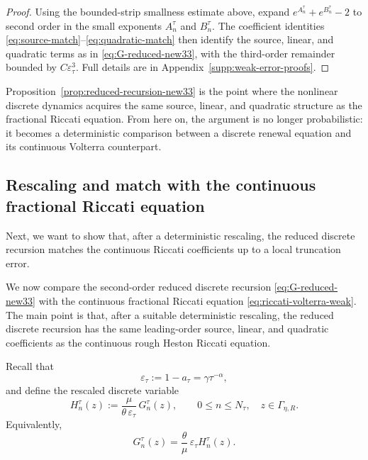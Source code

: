 \documentclass[letterpaper]{article}
\numberwithin{equation}{section}
\theoremstyle{definition}
\theoremstyle{remark}
\begin{document}
\begin{proof}
{Using the bounded-strip smallness estimate above, expand $e^{A_n^\tau}+e^{B_n^\tau}-2$ to second order in the small exponents $A_n^\tau$ and $B_n^\tau$. The coefficient identities \eqref{eq:source-match}--\eqref{eq:quadratic-match} then identify the source, linear, and quadratic terms as in \eqref{eq:G-reduced-new33}, with the third-order remainder bounded by $C\varepsilon_\tau^3$.} Full details are in Appendix~\ref{supp:weak-error-proofs}.
\end{proof}

Proposition~\ref{prop:reduced-recursion-new33} is the point where the nonlinear discrete dynamics acquires the same source, linear, and quadratic structure as the fractional Riccati equation. From here on, the argument is no longer probabilistic: it becomes a deterministic comparison between a discrete renewal equation and its continuous Volterra counterpart.


\subsection{Rescaling and match with the continuous fractional Riccati equation}
\label{subsec:rescaling-match}

Next, we want to show that, after a deterministic rescaling, the reduced discrete recursion matches the continuous Riccati coefficients up to a local truncation error.

We now compare the second-order reduced discrete recursion
\eqref{eq:G-reduced-new33} with the continuous fractional Riccati equation
\eqref{eq:riccati-volterra-weak}. The main point is that, after a suitable deterministic rescaling, the reduced discrete recursion has the same leading-order source, linear, and quadratic coefficients as the continuous rough Heston Riccati equation.

Recall that
\[
  \varepsilon_\tau:=1-a_\tau=\gamma\tau^{-\alpha},
\]
and define the rescaled discrete variable
\begin{equation}\label{eq:H-rescaled-def}
  H_n^\tau(z):=\frac{\mu}{\theta\,\varepsilon_\tau}\,G_n^\tau(z),
  \qquad 0\le n\le N_\tau,\quad z\in\Gamma_{\eta,R}.
\end{equation}
Equivalently,
\[
  G_n^\tau(z)=\frac{\theta}{\mu}\,\varepsilon_\tau H_n^\tau(z).
\]
\end{document}
